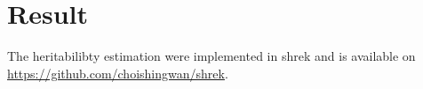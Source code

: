 	\section{Result}
		The heritabilibty estimation were implemented in \gls{shrek} and is available on \url{https://github.com/choishingwan/shrek}.  
		\begin{figure}
			\centering
			\centering
\end{figure}
